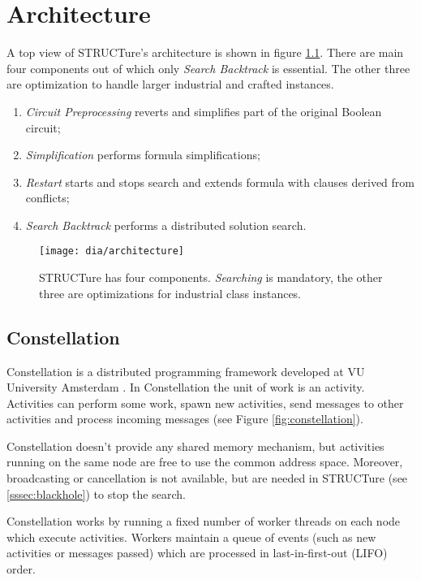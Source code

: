 \chapter{Architecture}
\label{chap:architecture}

A top view of STRUCTure's architecture is shown in figure
\ref{fig:architecture}. There are main four components
out of which only \emph{Search Backtrack} is essential.
The other three are optimization to handle larger
industrial and crafted instances.
\begin{enumerate}
  \item \emph{Circuit Preprocessing} reverts and simplifies 
  part of the original Boolean circuit;
  \item \emph{Simplification} performs formula simplifications;
  \item \emph{Restart} starts and stops search and extends
  formula with clauses derived from conflicts;
  \item \emph{Search Backtrack} performs a distributed solution search.
\end{enumerate}

\begin{figure}
  \centering
  \texttt{[image: dia/architecture]}
  \caption{STRUCTure has four components. \emph{Searching}
  is mandatory, the other three are optimizations
  for industrial class instances.}
  \label{fig:architecture}
\end{figure}


\section{Constellation}

Constellation is a distributed programming framework developed at VU University
Amsterdam \cite{mine:constellation}. In Constellation the unit of work is
an activity. Activities can perform some work, spawn new activities,
send messages to other activities and process incoming messages
(see Figure \ref{fig:constellation}).

Constellation doesn't provide any shared memory mechanism, but
activities running on the same node are free to use the common
address space. Moreover, broadcasting or cancellation is not
available, but are needed in STRUCTure (see \ref{sssec:blackhole})
to stop the search.

Constellation works by running a fixed number of worker threads
on each node which execute activities.  Workers maintain a
queue of events (such as new activities or messages passed) which are
processed in last-in-first-out (LIFO) order.


